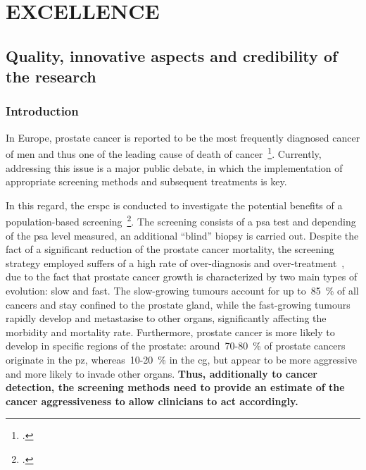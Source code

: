 \section{EXCELLENCE}
\label{sec:excellence}

\subsection{Quality, innovative aspects and credibility of the research}
\label{sec:quality}

\subsubsection{Introduction}
\label{sec:introduction}

In Europe, prostate cancer is reported to be the most frequently diagnosed cancer of men and thus one of the leading cause of death of cancer~\footcite{Ferlay2013}. 
Currently, addressing this issue is a major public debate, in which the implementation of appropriate screening methods and subsequent treatments is key.

In this regard, the \ac{erspc} is conducted to investigate the potential benefits of a population-based screening~\footcite{Schroder2015}. 
The screening consists of a \ac{psa} test and depending of the \ac{psa} level measured, an additional ``blind'' biopsy is carried out. 
Despite the fact of a significant reduction of the prostate cancer mortality, the screening strategy employed suffers of a high rate of over-diagnosis and over-treatment~\cite{Delpierre2013,Schroder2015}, due to the fact that prostate cancer growth is characterized by two main types of evolution: slow and fast.
The slow-growing tumours account for up to~85~\% of all cancers and stay confined to the prostate gland, while the fast-growing tumours rapidly develop and metastasise to other organs, significantly affecting the morbidity and mortality rate.
Furthermore, prostate cancer is more likely to develop in specific regions of the prostate: around~70-80~\% of prostate cancers originate in the \ac{pz}, whereas~10-20~\% in the \ac{cg}, but appear to be more aggressive and more likely to invade other organs. 
\textbf{Thus, additionally to cancer detection, the screening methods need to provide an estimate of the cancer aggressiveness to allow clinicians to act accordingly.}

